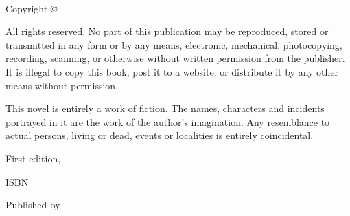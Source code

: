 
{\small
\setlength{\parindent}{0em}\setlength{\parskip}{1em}

~

\vfill

Copyright \copyright{} \startyear\,-\, \editionyear\, \authorname

All rights reserved. No part of this publication may be reproduced, stored or transmitted in any form or by any means, electronic, mechanical, photocopying, recording, scanning, or otherwise without written permission from the publisher. It is illegal to copy this book, post it to a website, or distribute it by any other means without permission.

This novel is entirely a work of fiction. The names, characters and incidents portrayed in it are the work of the author’s imagination. Any resemblance to actual persons, living or dead, events or localities is entirely coincidental.

First edition, \editionyear{}

ISBN \isbn{}  %

Published by \publisher{}
}
